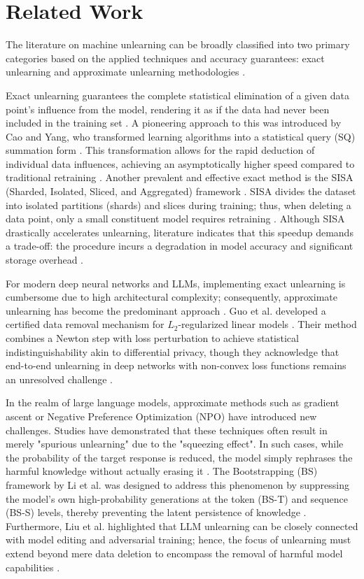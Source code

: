 \documentclass[conference]{IEEEtran}
\begin{document}
\section{Related Work}
The literature on machine unlearning can be broadly classified into two primary categories based on the applied techniques 
and accuracy guarantees: exact unlearning and approximate unlearning methodologies \cite{wang2026machineunlearningcomprehensivesurvey, Liu2025}. 

Exact unlearning guarantees the complete statistical elimination of a given data point's influence from the model, 
rendering it as if the data had never been included in the training set \cite{wang2026machineunlearningcomprehensivesurvey}. 
A pioneering approach to this was introduced by Cao and Yang, who transformed learning algorithms into a statistical query (SQ) 
summation form \cite{7163042}. This transformation allows for the rapid deduction of individual data influences, achieving an 
asymptotically higher speed compared to traditional retraining \cite{7163042}. Another prevalent and effective exact 
method is the SISA (Sharded, Isolated, Sliced, and Aggregated) framework \cite{9519428}. SISA divides the dataset 
into isolated partitions (shards) and slices during training; thus, when deleting a data point, only a small constituent 
model requires retraining \cite{9519428}. Although SISA drastically accelerates unlearning, literature indicates that this 
speedup demands a trade-off: the procedure incurs a degradation in model accuracy and significant storage overhead \cite{9519428}.

For modern deep neural networks and LLMs, implementing exact unlearning is cumbersome due to high architectural complexity; 
consequently, approximate unlearning has become the predominant approach \cite{Liu2025}. Guo et al. developed a certified data 
removal mechanism for $L_2$-regularized linear models \cite{guo2023certifieddataremovalmachine}. Their method combines 
a Newton step with loss perturbation to achieve statistical indistinguishability akin to differential privacy, though they 
acknowledge that end-to-end unlearning in deep networks with non-convex loss functions remains an unresolved 
challenge \cite{guo2023certifieddataremovalmachine}. 

In the realm of large language models, approximate methods such as gradient ascent or Negative Preference Optimization (NPO) have 
introduced new challenges. Studies have demonstrated that these techniques often result in merely "spurious unlearning" due to the 
"squeezing effect". In such cases, while the probability of the target response is reduced, the model simply rephrases the harmful 
knowledge without actually erasing it \cite{ICLR2026_a63ce8e6}. The Bootstrapping (BS) framework by Li et al. was designed to 
address this phenomenon by suppressing the model's own high-probability generations at the token (BS-T) and sequence (BS-S) levels, 
thereby preventing the latent persistence of knowledge \cite{ICLR2026_a63ce8e6}. Furthermore, Liu et al. highlighted that 
LLM unlearning can be closely connected with model editing and adversarial training; hence, the focus of unlearning must 
extend beyond mere data deletion to encompass the removal of harmful model capabilities \cite{Liu2025}.
\end{document}
